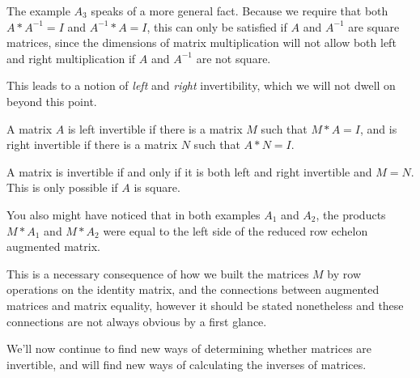 \documentclass{ximera}
\begin{document}
\begin{remark}
  The example $A_3$ speaks of a more general fact. Because we require that both $A*A^{-1}=I$ and $A^{-1}*A=I$, this can only be satisfied if $A$ and $A^{-1}$ are square matrices, since the dimensions of matrix multiplication will not allow both left and right multiplication if $A$ and $A^{-1}$ are not square. 

  This leads to a notion of \emph{left} and \emph{right} invertibility, which we will not dwell on beyond this point.
\end{remark}

\begin{definition}
  A matrix $A$ is left invertible if there is a matrix $M$ such that $M*A=I$, and is right invertible if there is a matrix $N$ such that $A*N=I$. 
  
  A matrix is invertible if and only if it is both left and right invertible and $M=N$. This is only possible if $A$ is square.
\end{definition}

\begin{remark}
  You also might have noticed that in both examples $A_1$ and $A_2$, the products $M*A_1$ and $M*A_2$ were equal to the left side of the reduced row echelon augmented matrix. 

  This is a necessary consequence of how we built the matrices $M$ by row operations on the identity matrix, and the connections between augmented matrices and matrix equality, however it should be stated nonetheless and these connections are not always obvious by a first glance.
\end{remark}

We'll now continue to find new ways of determining whether matrices are invertible, and will find new ways of calculating the inverses of matrices.
\end{document}
